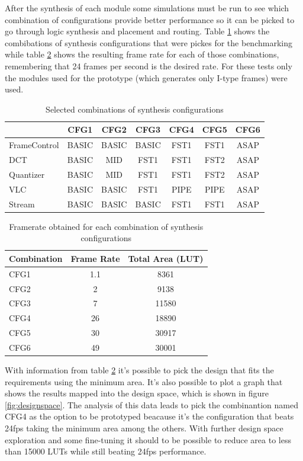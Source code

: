 After the synthesis of each module some simulations must be run to see which combination of configurations provide better performance so it can be picked to go through logic synthesis and placement and routing. Table \ref{tab:combination} shows the combibations of synthesis configurations that were pickes for the benchmarking while table \ref{tab:fps} shows the resulting frame rate for each of those combinations, remembering that 24 frames per second is the desired rate. For these tests only the modules used for the prototype (which generates only I-type frames) were used.

\begin{table}[h]
\centering
\begin{tabular}{|l||c|c|c|c|c|c|}
\hline
		& CFG1	& CFG2	& CFG3	& CFG4	& CFG5 & CFG6 \\ \hline
FrameControl 	& BASIC	& BASIC	& BASIC & FST1  & FST1 & ASAP \\ \hline
DCT		& BASIC & MID   & FST1  & FST1  & FST2 & ASAP \\ \hline
Quantizer	& BASIC & MID   & FST1  & FST1  & FST2 & ASAP \\ \hline
VLC		& BASIC & BASIC & FST1  & PIPE  & PIPE & ASAP \\ \hline
Stream		& BASIC & BASIC & BASIC & FST1  & FST1 & ASAP \\ \hline
\end{tabular}
\caption{Selected combinations of synthesis configurations}
\label{tab:combination}
\end{table}

\begin{table}[h]
\centering
\begin{tabular}{|l|c|c|}
\hline
Combination & Frame Rate & Total Area (LUT) \\ \hline
CFG1 & 1.1 & 8361\\ \hline
CFG2 & 2 & 9138\\ \hline
CFG3 & 7 & 11580\\ \hline
CFG4 & 26  & 18890 \\ \hline
CFG5 & 30  & 30917\\ \hline
CFG6 & 49  & 30001 \\ \hline
\end{tabular}
\caption{Framerate obtained for each combination of synthesis configurations }
\label{tab:fps}
\end{table}

With information from table \ref{tab:fps} it's possible to pick the design that fits the requirements using the minimum area. It's also possible to plot a graph that shows the results mapped into the design space, which is shown in figure \ref{fig:designspace}. The analysis of this data leads to pick the combinantion named CFG4 as the option to be prototyped beacause it's the configuration that beats 24fps taking the minimum area among the others. With further design space exploration and some fine-tuning it should to be possible to reduce area to less than 15000 LUTs while still beating 24fps performance.


